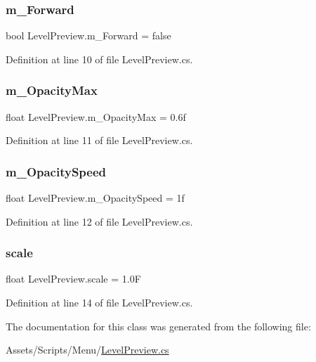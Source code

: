 \subsubsection{\texorpdfstring{m\+\_\+\+Forward}{m\_Forward}}
{\footnotesize\ttfamily bool Level\+Preview.\+m\+\_\+\+Forward = false}



Definition at line 10 of file Level\+Preview.\+cs.

\mbox{\label{class_level_preview_a093eee8216a6cd9a4e9df3bafaa499c4}} 
\subsubsection{\texorpdfstring{m\+\_\+\+Opacity\+Max}{m\_OpacityMax}}
{\footnotesize\ttfamily float Level\+Preview.\+m\+\_\+\+Opacity\+Max = 0.\+6f}



Definition at line 11 of file Level\+Preview.\+cs.

\mbox{\label{class_level_preview_ac0f6398d00a9b0034c3dddcc65bb43ff}} 
\subsubsection{\texorpdfstring{m\+\_\+\+Opacity\+Speed}{m\_OpacitySpeed}}
{\footnotesize\ttfamily float Level\+Preview.\+m\+\_\+\+Opacity\+Speed = 1f}



Definition at line 12 of file Level\+Preview.\+cs.

\mbox{\label{class_level_preview_a5f45d3813175e1162195302258d41000}} 
\subsubsection{\texorpdfstring{scale}{scale}}
{\footnotesize\ttfamily float Level\+Preview.\+scale = 1.\+0F}



Definition at line 14 of file Level\+Preview.\+cs.



The documentation for this class was generated from the following file\+:\begin{DoxyCompactItemize}
\item 
Assets/\+Scripts/\+Menu/\mbox{\hyperlink{_level_preview_8cs}{Level\+Preview.\+cs}}\end{DoxyCompactItemize}
